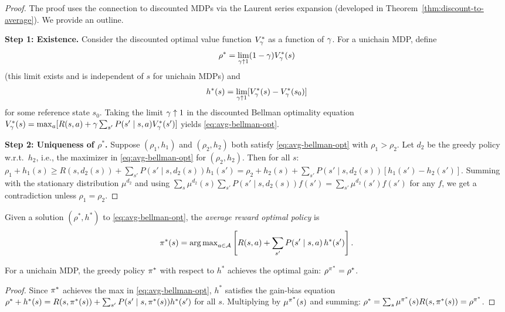 \documentclass[11pt,a4paper]{article}
\begin{document}
\begin{proof}
The proof uses the connection to discounted MDPs via the Laurent
series expansion (developed in
Theorem~\ref{thm:discount-to-average}). We provide an outline.

\textbf{Step 1: Existence.}
Consider the discounted optimal value function $V^*_\gamma$ as
a function of $\gamma$. For a unichain MDP, define
\[
    \rho^* = \lim_{\gamma \uparrow 1} (1-\gamma)
    V^*_\gamma(s)
\]
(this limit exists and is independent of $s$ for unichain MDPs) and
\[
    h^*(s) = \lim_{\gamma \uparrow 1}
    [V^*_\gamma(s) - V^*_\gamma(s_0)]
\]
for some reference state $s_0$. Taking the limit
$\gamma \uparrow 1$ in the discounted Bellman optimality equation
$V^*_\gamma(s) = \max_a [R(s,a) + \gamma \sum_{s'}
P(s' \mid s,a) V^*_\gamma(s')]$ yields
\eqref{eq:avg-bellman-opt}.

\textbf{Step 2: Uniqueness of $\rho^*$.}
Suppose $(\rho_1, h_1)$ and $(\rho_2, h_2)$ both satisfy
\eqref{eq:avg-bellman-opt} with $\rho_1 > \rho_2$. Let $d_2$ be the
greedy policy w.r.t.\ $h_2$, i.e., the maximizer in
\eqref{eq:avg-bellman-opt} for $(\rho_2, h_2)$. Then for all $s$:
$\rho_1 + h_1(s) \geq R(s, d_2(s)) + \sum_{s'} P(s' \mid s,
d_2(s)) h_1(s') = \rho_2 + h_2(s) + \sum_{s'} P(s' \mid s,
d_2(s))[h_1(s') - h_2(s')]$.
Summing with the stationary distribution $\mu^{d_2}$ and using
$\sum_s \mu^{d_2}(s) \sum_{s'} P(s' \mid s, d_2(s)) f(s') =
\sum_{s'} \mu^{d_2}(s') f(s')$ for any $f$, we get a contradiction
unless $\rho_1 = \rho_2$.
\end{proof}

\begin{definition}
\label{def:avg-greedy}
Given a solution $(\rho^*, h^*)$ to \eqref{eq:avg-bellman-opt}, the
\emph{average reward optimal policy} is
\[
    \pi^*(s) = \operatorname{arg\,max}_{a \in \mathcal{A}}
    \left[ R(s,a) + \sum_{s'} P(s' \mid s,a)\, h^*(s') \right].
\]
\end{definition}

\begin{theorem}
\label{thm:avg-greedy-optimal}
For a unichain MDP, the greedy policy $\pi^*$ with respect to
$h^*$ achieves the optimal gain: $\rho^{\pi^*} = \rho^*$.
\end{theorem}

\begin{proof}
Since $\pi^*$ achieves the max in \eqref{eq:avg-bellman-opt},
$h^*$ satisfies the gain-bias equation
$\rho^* + h^*(s) = R(s, \pi^*(s)) + \sum_{s'} P(s' \mid s,
\pi^*(s)) h^*(s')$ for all $s$. Multiplying by
$\mu^{\pi^*}(s)$ and summing:
$\rho^* = \sum_s \mu^{\pi^*}(s) R(s, \pi^*(s)) =
\rho^{\pi^*}$.
\end{proof}
\end{document}
